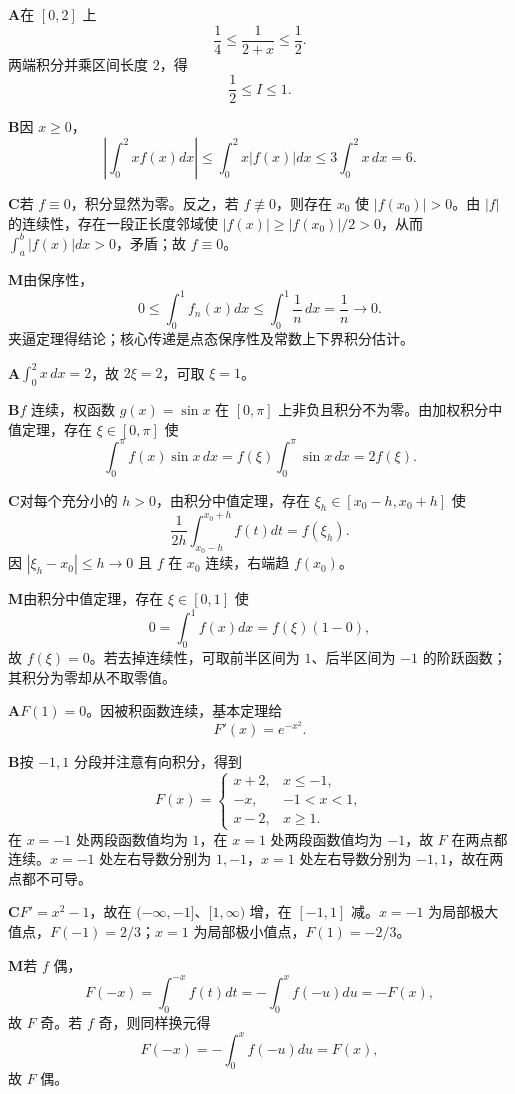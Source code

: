 \begin{solutionBox}
\textbf{A}\quad 在 \([0,2]\) 上
\[
\frac14\le\frac1{2+x}\le\frac12.
\]
两端积分并乘区间长度 \(2\)，得
\[
\frac12\le I\le1.
\]

\textbf{B}\quad 因 \(x\ge0\)，
\[
\left|\int_0^2xf(x)dx\right|
\le\int_0^2x|f(x)|dx
\le3\int_0^2x\,dx=6.
\]

\textbf{C}\quad 若 \(f\equiv0\)，积分显然为零。反之，若 \(f\not\equiv0\)，则存在 \(x_0\) 使 \(|f(x_0)|>0\)。由 \(|f|\) 的连续性，存在一段正长度邻域使 \(|f(x)|\ge |f(x_0)|/2>0\)，从而 \(\int_a^b|f(x)|dx>0\)，矛盾；故 \(f\equiv0\)。

\textbf{M}\quad 由保序性，
\[
0\le\int_0^1f_n(x)dx\le\int_0^1\frac1n\,dx=\frac1n\to0.
\]
夹逼定理得结论；核心传递是点态保序性及常数上下界积分估计。
\end{solutionBox}

\begin{solutionBox}
\textbf{A}\quad \(\int_0^2x\,dx=2\)，故 \(2\xi=2\)，可取 \(\xi=1\)。

\textbf{B}\quad \(f\) 连续，权函数 \(g(x)=\sin x\) 在 \([0,\pi]\) 上非负且积分不为零。由加权积分中值定理，存在 \(\xi\in[0,\pi]\) 使
\[
\int_0^\pi f(x)\sin x\,dx
=f(\xi)\int_0^\pi\sin x\,dx
=2f(\xi).
\]

\textbf{C}\quad 对每个充分小的 \(h>0\)，由积分中值定理，存在 \(\xi_h\in[x_0-h,x_0+h]\) 使
\[
\frac1{2h}\int_{x_0-h}^{x_0+h}f(t)dt=f(\xi_h).
\]
因 \(|\xi_h-x_0|\le h\to0\) 且 \(f\) 在 \(x_0\) 连续，右端趋 \(f(x_0)\)。

\textbf{M}\quad 由积分中值定理，存在 \(\xi\in[0,1]\) 使
\[
0=\int_0^1f(x)dx=f(\xi)(1-0),
\]
故 \(f(\xi)=0\)。若去掉连续性，可取前半区间为 \(1\)、后半区间为 \(-1\) 的阶跃函数；其积分为零却从不取零值。
\end{solutionBox}

\begin{solutionBox}
\textbf{A}\quad \(F(1)=0\)。因被积函数连续，基本定理给
\[
F'(x)=e^{-x^2}.
\]

\textbf{B}\quad 按 \(-1,1\) 分段并注意有向积分，得到
\[
F(x)=
\begin{cases}
x+2,&x\le-1,\\
-x,&-1<x<1,\\
x-2,&x\ge1.
\end{cases}
\]
在 \(x=-1\) 处两段函数值均为 \(1\)，在 \(x=1\) 处两段函数值均为 \(-1\)，故 \(F\) 在两点都连续。\(x=-1\) 处左右导数分别为 \(1,-1\)，\(x=1\) 处左右导数分别为 \(-1,1\)，故在两点都不可导。

\textbf{C}\quad \(F'=x^2-1\)，故在 \((-\infty,-1]\)、\([1,\infty)\) 增，在 \([-1,1]\) 减。\(x=-1\) 为局部极大值点，\(F(-1)=2/3\)；\(x=1\) 为局部极小值点，\(F(1)=-2/3\)。

\textbf{M}\quad 若 \(f\) 偶，
\[
F(-x)=\int_0^{-x}f(t)dt=-\int_0^xf(-u)du=-F(x),
\]
故 \(F\) 奇。若 \(f\) 奇，则同样换元得
\[
F(-x)=-\int_0^xf(-u)du=F(x),
\]
故 \(F\) 偶。
\end{solutionBox}


